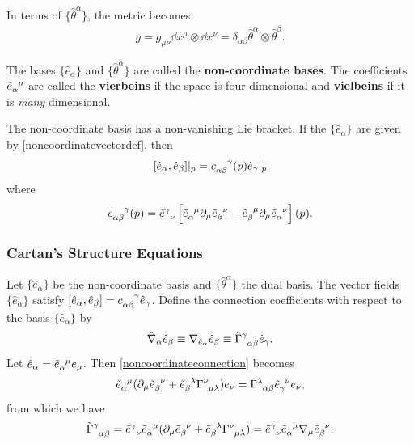 \documentclass[10pt]{article}
\begin{document}
In terms of $\{\hat{\theta}^\alpha\}$, the metric becomes
\begin{align}
    g=g_{\mu\nu}\dd{x^\mu}\otimes\dd{x^\nu}=\delta_{\alpha\beta}\hat{\theta}^\alpha\otimes\hat{\theta}^\beta.
\end{align}

The bases $\{\hat{e}_\alpha\}$ and $\{\hat{\theta}^\alpha\}$ are called the \textbf{non-coordinate bases}.
The coefficients $\tensor{\tilde{e}}{_\alpha^\mu}$ are called the \textbf{vierbeins} if the space is four dimensional and \textbf{vielbeins} if it is \textit{many} dimensional.

The non-coordinate basis has a non-vanishing Lie bracket.
If the $\{\hat{e}_\alpha\}$ are given by \eqref{noncoordinatevectordef}, then
\begin{align}
    \comm{\hat{e}_\alpha}{\hat{e}_\beta}|_p=\tensor{c}{_\alpha_\beta^\gamma}(p)\hat{e}_\gamma|_p
\end{align}
where
\begin{align}
    \tensor{c}{_\alpha_\beta^\gamma}(p)=\tensor{\tilde{e}}{^\gamma_\nu}\left[\tensor{\tilde{e}}{_\alpha^\mu}\partial_\mu \tensor{\tilde{e}}{_\beta^\nu}-\tensor{\tilde{e}}{_\beta^\mu}\partial_\mu \tensor{\tilde{e}}{_\alpha^\nu}\right](p).
\end{align}

\subsubsection{Cartan's Structure Equations}
Let $\{\hat{e}_\alpha\}$ be the non-coordinate basis and $\{\hat{\theta}^\alpha\}$ the dual basis.
The vector fields $\{\hat{e}_\alpha\}$ satisfy $\comm{\hat{e}_\alpha}{\hat{e}_\beta}=\tensor{c}{_\alpha_\beta^\gamma}\hat{e}_\gamma$.
Define the connection coefficients with respect to the basis $\{\hat{e}_\alpha\}$ by
\begin{align}\label{noncoordinateconnection}
    \hat{\nabla}_\alpha \hat{e}_\beta\equiv\nabla_{\hat{e}_\alpha}\hat{e}_\beta\equiv\tensor{\hat{\Gamma}}{^\gamma_\alpha_\beta}\hat{e}_\gamma.
\end{align}
Let $\hat{e}_\alpha=\tensor{\tilde{e}}{_\alpha^\mu}e_\mu$.
Then \eqref{noncoordinateconnection} becomes
\begin{align}
    \tensor{\tilde{e}}{_\alpha^\mu}(\partial_\mu \tensor{\tilde{e}}{_\beta^\nu}+\tensor{\tilde{e}}{_\beta^\lambda}\tensor{\Gamma}{^\nu_\mu_\lambda})e_\nu=\tensor{\tilde{\Gamma}}{^\lambda_\alpha_\beta}\tensor{\tilde{e}}{_\gamma^\nu}e_\nu,
\end{align}
from which we have
\begin{align}\label{eq:noncoordinateconnectionversus}
    \tensor{\tilde{\Gamma}}{^\gamma_\alpha_\beta}=\tensor{\tilde{e}}{^\gamma_\nu}\tensor{\tilde{e}}{_\alpha^\mu}(\partial_\mu\tensor{\tilde{e}}{_\beta^\nu}+\tensor{\tilde{e}}{_\beta^\lambda}\tensor{\Gamma}{^\nu_\mu_\lambda})=\tensor{\tilde{e}}{^\gamma_\nu}\tensor{\tilde{e}}{_\alpha^\mu}\nabla_\mu \tensor{\tilde{e}}{_\beta^\nu}.
\end{align}
\end{document}
